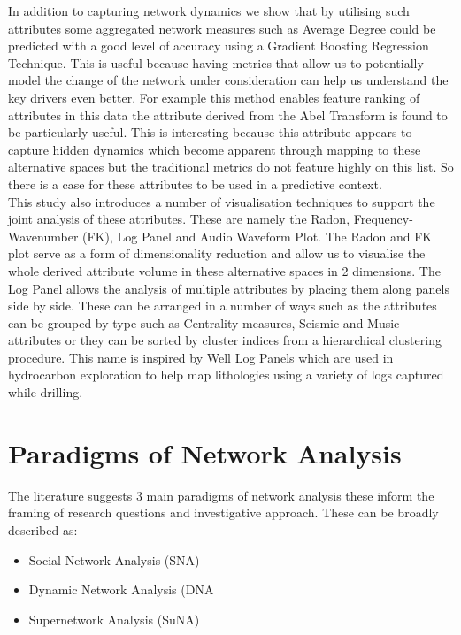 In addition to capturing network dynamics we show that by utilising such attributes some aggregated network measures such as Average Degree could be predicted with a good level of accuracy using a Gradient Boosting Regression Technique. This is useful because having metrics that allow us to potentially model the change of the network under consideration can help us understand the key drivers even better. For example this method enables feature ranking of attributes in this data the attribute derived from the Abel Transform is found to be particularly useful. This is interesting because this attribute appears to capture hidden dynamics which become apparent through mapping to these alternative spaces but the traditional metrics do not feature highly on this list. So there is a case for these attributes to be used in a predictive context. \\

This study also introduces a number of visualisation techniques to support the joint analysis of these attributes. These are namely the Radon, Frequency-Wavenumber (FK), Log Panel and Audio Waveform Plot. The Radon and FK  plot serve as a form of dimensionality reduction and allow us to visualise the whole derived attribute volume in these alternative spaces in 2 dimensions. The Log Panel allows the analysis of multiple attributes by placing them along panels side by side. These can be arranged in a number of ways such as the attributes can be grouped by type such as Centrality measures, Seismic and Music attributes or they can be sorted by cluster indices from a hierarchical clustering procedure. This name is inspired by Well Log Panels which are used in hydrocarbon exploration to help map lithologies using a variety of logs captured while drilling.

\section{Paradigms of Network Analysis}

The literature suggests 3 main paradigms of network analysis these inform the framing of research questions and investigative approach. These can be broadly described as: \cite{Chapanond2005}

\begin{itemize}
    \item Social Network Analysis (SNA)
    \item Dynamic Network Analysis (DNA
    \item Supernetwork Analysis (SuNA)
\end{itemize}

